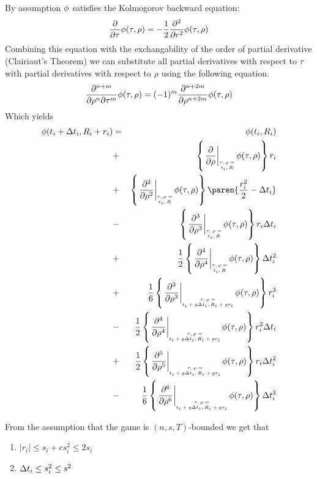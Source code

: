 \documentclass{article}[12pt]
\begin{document}
{By assumption $\phi$ satisfies the Kolmogorov backward equation:
\begin{equation*} 
  \frac{\partial}{\partial \tau} \phi(\tau,\rho)
  = -\frac{1}{2} \frac{\partial^2}{\partial r^2} \phi(\tau,\rho)
\end{equation*}
Combining this equation with the exchangability of the order of
partial derivative (Clairiaut's Theorem) we can substitute all
partial derivatives with respect to $\tau$ with partial derivatives
with respect to $\rho$ using the following equation.
\[
  \frac{\partial^{n+m}}{\partial \rho^n \partial \tau^m} \phi(\tau,\rho)=
  (-1)^m \frac{\partial^{n+2m}}{\partial \rho^{n+2m}} \phi(\tau,\rho)
\]
Which yields
\begin{eqnarray}
      \pot(t_i+\deltat_i,\R_i+r_i) & =&  
    \pot(t_i,\R_i)\\
    &+& \at{\frac{\partial}{\partial \rho}} r_i \label{term:coll1}\\
    &+& \at{\frac{\partial^2}{\partial \rho^2}} \paren{\frac{r_i^2}{2}-\deltat_i} \label{term:coll2}\\
    &-& \at{\frac{\partial^3}{\partial \rho^3}} r_i \deltat_i \label{term:coll3}\\
    &+& \frac{1}{2} \at{\frac{\partial^4}{\partial \rho^4}} \deltat_i^2 \label{term:coll4}\\
    &+& \frac{1}{6} \att{\frac{\partial^3}{\partial \rho^3}} r_i^3 \label{term:coll5}\\
    &-& \frac{1}{2} \att{\frac{\partial^4}{\partial \rho^4}} r_i^2\deltat_i \label{term:coll6}\\
    &+& \frac{1}{2} \att{\frac{\partial^5}{\partial \rho^5}} r_i\deltat_i^2 \label{term:coll7}\\
    &-& \frac{1}{6} \att{\frac{\partial^6}{\partial \rho^6}} \deltat_i^3 \label{term:coll8}
\end{eqnarray}

  From the assumption that the game is $(n,s,T)$-bounded we get that 
  \begin{enumerate}
  \item $|r_i| \leq s_i +c s_i^2 \leq 2 s_i$
  \item $\Delta t_i \leq s_i^2 \leq s^2$
  \end{enumerate}

}
\end{document}
